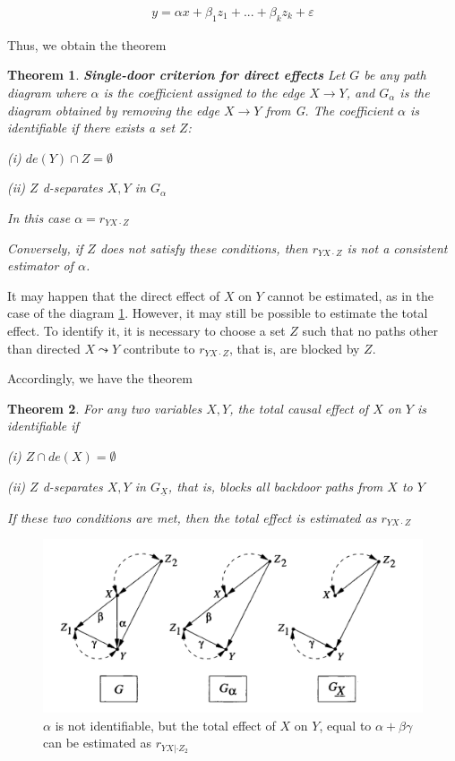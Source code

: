 \documentclass[fleqn]{article}
\newtheorem{theorem}{Theorem}
\numberwithin{equation}{section}
\numberwithin{theorem}{section}
\numberwithin{figure}{section}
\numberwithin{lemma}{section}
\numberwithin{corollary}{section}
\begin{document}
\begin{align}
	y = \alpha x + \beta_1z_1 + ... + \beta_kz_k + \varepsilon
\end{align}

Thus, we obtain the theorem

\begin{theorem}
	\textbf{Single-door criterion for direct effects} Let $G$ be any path diagram where $\alpha$ is the coefficient assigned to the edge $X \to Y$, and $G_\alpha$ is the diagram obtained by removing the edge $X\to Y$ from G. The coefficient $\alpha$ is identifiable if there exists a set $Z$:
	
	(i) $de(Y) \cap Z = \emptyset$
	
	(ii) $Z$ d-separates $X,Y$ in $G_\alpha$
	
	In this case $\alpha = r_{YX\cdot Z}$
	
	Conversely, if $Z$ does not satisfy these conditions, then $r_{YX\cdot Z}$ is not a consistent estimator of $\alpha$.
\end{theorem}

It may happen that the direct effect of $X$ on $Y$ cannot be estimated, as in the case of the diagram \ref{fig:total_effect}. However, it may still be possible to estimate the total effect. To identify it, it is necessary to choose a set $Z$ such that no paths other than directed $X \leadsto Y$ contribute to $r_{YX\cdot Z}$, that is, are blocked by $Z$.

Accordingly, we have the theorem 

\begin{theorem}
	For any two variables $X,Y$, the total causal effect of $X$ on $Y$ is identifiable if 
	
	(i) $Z \cap de(X) = \emptyset$
	
	(ii) $Z$ d-separates $X,Y$ in $G_{\underline X}$, that is, blocks all backdoor paths from $X$ to $Y$
	
	If these two conditions are met, then the total effect is estimated as $r_{YX \cdot Z}$
\end{theorem}

\begin{figure}[h]
	\begin{center}
		\includegraphics[scale=0.6]{imgs/img32.png}
	\end{center}
	\caption{$\alpha$ is not identifiable, but the total effect of $X$ on $Y$, equal to $\alpha + \beta \gamma $ can be estimated as $r_{YX|\cdot Z_2}$}
	\label{fig:total_effect}
\end{figure}
\end{document}
